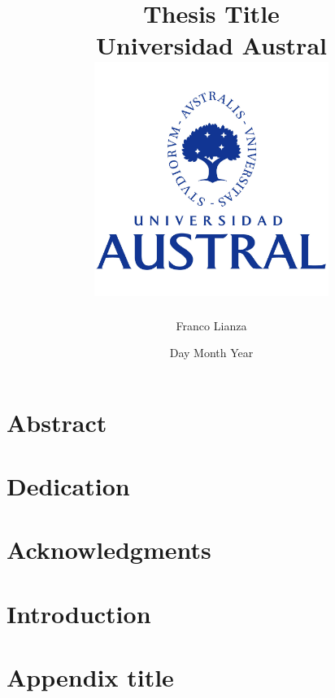\documentclass[twoside]{report}
\title{
	{Thesis Title}\\
	{\large Universidad Austral}\\
	{\includegraphics[width=3in,height=3in]{university.jpg}}
}
\author{Franco Lianza}
\date{Day Month Year}
\begin{document}
\maketitle

\chapter*{Abstract}
\lipsum[1]

\chapter*{Dedication}
\lipsum[1]

\chapter*{Acknowledgments}
\lipsum[1]

\tableofcontents

\chapter{Introduction}


\appendix
\chapter{Appendix title}

\end{document}
